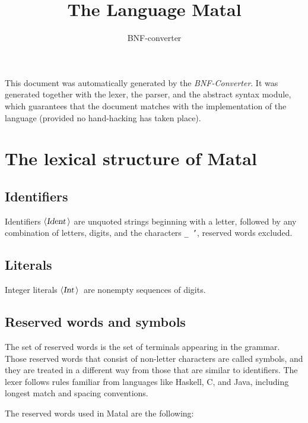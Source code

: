 \documentclass[a4paper,11pt]{article}
\author{BNF-converter}
\title{The Language Matal}
\begin{document}
\maketitle

\newcommand{\emptyP}{\mbox{$\epsilon$}}
\newcommand{\terminal}[1]{\mbox{{\texttt {#1}}}}
\newcommand{\nonterminal}[1]{\mbox{$\langle \mbox{{\sl #1 }} \! \rangle$}}
\newcommand{\arrow}{\mbox{::=}}
\newcommand{\delimit}{\mbox{$|$}}
\newcommand{\reserved}[1]{\mbox{{\texttt {#1}}}}
\newcommand{\literal}[1]{\mbox{{\texttt {#1}}}}
\newcommand{\symb}[1]{\mbox{{\texttt {#1}}}}

This document was automatically generated by the {\em BNF-Converter}. It was generated together with the lexer, the parser, and the abstract syntax module, which guarantees that the document matches with the implementation of the language (provided no hand-hacking has taken place).

\section*{The lexical structure of Matal}
\subsection*{Identifiers}
Identifiers \nonterminal{Ident} are unquoted strings beginning with a letter,
followed by any combination of letters, digits, and the characters {\tt \_ '},
reserved words excluded.


\subsection*{Literals}
Integer literals \nonterminal{Int}\ are nonempty sequences of digits.




\subsection*{Reserved words and symbols}
The set of reserved words is the set of terminals appearing in the grammar. Those reserved words that consist of non-letter characters are called symbols, and they are treated in a different way from those that are similar to identifiers. The lexer follows rules familiar from languages like Haskell, C, and Java, including longest match and spacing conventions.

The reserved words used in Matal are the following: \\
\end{document}
